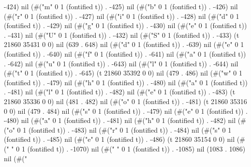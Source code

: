 -424) nil (#("m" 0 1 (fontified t)) . -425) nil (#("b" 0 1 (fontified t)) . -426) nil (#("r" 0 1 (fontified t)) . -427) nil (#("i" 0 1 (fontified t)) . -428) nil (#("d" 0 1 (fontified t)) . -429) nil (#("g" 0 1 (fontified t)) . -430) nil (#("e" 0 1 (fontified t)) . -431) nil (#("U" 0 1 (fontified t)) . -432) nil (#("S" 0 1 (fontified t)) . -433) (t 21860 35431 0 0) nil (639 . 648) nil (#("d" 0 1 (fontified t)) . -639) nil (#("e" 0 1 (fontified t)) . -640) nil (#("f" 0 1 (fontified t)) . -641) nil (#("a" 0 1 (fontified t)) . -642) nil (#("u" 0 1 (fontified t)) . -643) nil (#("l" 0 1 (fontified t)) . -644) nil (#("t" 0 1 (fontified t)) . -645) (t 21860 35392 0 0) nil (479 . 486) nil (#("w" 0 1 (fontified t)) . -479) nil (#("h" 0 1 (fontified t)) . -480) nil (#("a" 0 1 (fontified t)) . -481) nil (#("l" 0 1 (fontified t)) . -482) nil (#("e" 0 1 (fontified t)) . -483) (t 21860 35336 0 0) nil (481 . 482) nil (#("o" 0 1 (fontified t)) . -481) (t 21860 35316 0 0) nil (479 . 484) nil (#("s" 0 1 (fontified t)) . -479) nil (#("e" 0 1 (fontified t)) . -480) nil (#("a" 0 1 (fontified t)) . -481) nil (#("h" 0 1 (fontified t)) . -482) nil (#("o" 0 1 (fontified t)) . -483) nil (#("r" 0 1 (fontified t)) . -484) nil (#("s" 0 1 (fontified t)) . -485) nil (#("e" 0 1 (fontified t)) . -486) (t 21860 35154 0 0) nil (#(" " 0 1 (fontified t)) . -1070) nil (#(" " 0 1 (fontified t)) . -1085) nil (1083 . 1086) nil (#("
